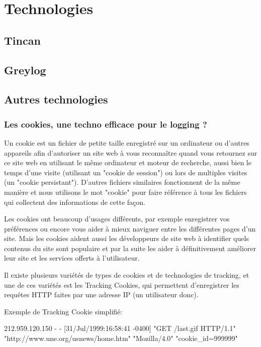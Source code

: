 \chapter{Technologies}

    \section{Tincan  }
    \section{Greylog  }
    
    \section{Autres technologies}
    
    \subsection{Les cookies, une techno efficace pour le logging ?}
    
    Un cookie est un fichier de petite taille enregistré sur un ordinateur ou d'autres appareils afin d'autoriser un site web à vous reconnaître quand vous retournez sur ce site web en utilisant le même ordinateur et moteur de recherche, aussi bien le temps d'une visite (utilisant un "cookie de session") ou lors de multiples visites (un "cookie persistant"). D'autres fichiers similaires fonctionnent de la même manière et nous utilisons le mot "cookie" pour faire référence à tous les fichiers qui collectent des informations de cette façon.
    
    Les cookies ont beaucoup d'usages différents, par exemple enregistrer vos préférences ou encore vous aider à mieux naviguer entre les différentes pages d'un site. Mais les cookies aident aussi les développeurs de site web à identifier quels contenus du site sont populaire et par la suite les aider à définitivement améliorer leur site et les services offerts à l'utilisateur.
    
    Il existe plusieurs variétés de types de cookies et de technologies de tracking, et une de ces variétés est les Tracking Cookies, qui permettent d'enregistrer les requêtes HTTP faites par une adresse IP (un utilisateur donc). 
    
    Exemple de Tracking Cookie simplifié: 
    
    212.959.120.150 - - [31/Jul/1999:16:58:41 -0400] "GET /last.gif HTTP/1.1" "http://www.une.org/usnews/home.htm" "Mozilla/4.0" "cookie_id=999999"
    

